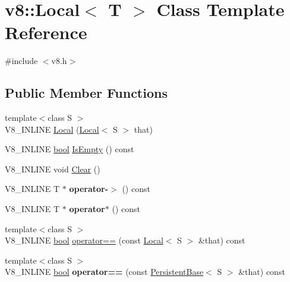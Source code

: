 \hypertarget{classv8_1_1Local}{}\section{v8\+:\+:Local$<$ T $>$ Class Template Reference}
\label{classv8_1_1Local}


{\ttfamily \#include $<$v8.\+h$>$}

\subsection*{Public Member Functions}
\begin{DoxyCompactItemize}
\item 
{\footnotesize template$<$class S $>$ }\\V8\+\_\+\+I\+N\+L\+I\+NE \mbox{\hyperlink{classv8_1_1Local_a18d761713c1062a38f58a568fffe8f80}{Local}} (\mbox{\hyperlink{classv8_1_1Local}{Local}}$<$ S $>$ that)
\item 
V8\+\_\+\+I\+N\+L\+I\+NE \mbox{\hyperlink{classbool}{bool}} \mbox{\hyperlink{classv8_1_1Local_aeec81dfca98e0d5b2f26ae13c2d141f4}{Is\+Empty}} () const
\item 
V8\+\_\+\+I\+N\+L\+I\+NE void \mbox{\hyperlink{classv8_1_1Local_a6fcf63af6bdd697ddd7c3acd16c69899}{Clear}} ()
\item 
\mbox{\label{classv8_1_1Local_a623075fb5b2f5d11d5d1605d97caf9a7}} 
V8\+\_\+\+I\+N\+L\+I\+NE T $\ast$ {\bfseries operator-\/$>$} () const
\item 
\mbox{\label{classv8_1_1Local_a3c96c0bc5db1288bad5769e8e54e26da}} 
V8\+\_\+\+I\+N\+L\+I\+NE T $\ast$ {\bfseries operator$\ast$} () const
\item 
{\footnotesize template$<$class S $>$ }\\V8\+\_\+\+I\+N\+L\+I\+NE \mbox{\hyperlink{classbool}{bool}} \mbox{\hyperlink{classv8_1_1Local_a0dfaa25015487674f568a4e1cd0be48c}{operator==}} (const \mbox{\hyperlink{classv8_1_1Local}{Local}}$<$ S $>$ \&that) const
\item 
\mbox{\label{classv8_1_1Local_adb40332ce6a33ae498af05809c0a2389}} 
{\footnotesize template$<$class S $>$ }\\V8\+\_\+\+I\+N\+L\+I\+NE \mbox{\hyperlink{classbool}{bool}} {\bfseries operator==} (const \mbox{\hyperlink{classv8_1_1PersistentBase}{Persistent\+Base}}$<$ S $>$ \&that) const

\end{DoxyCompactItemize}
